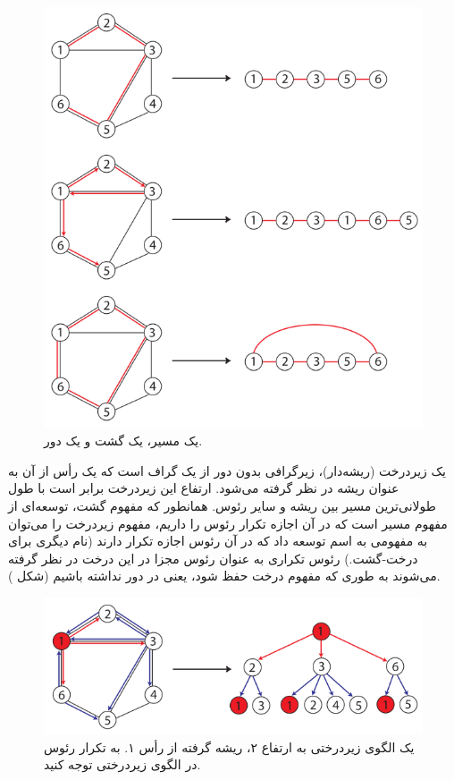 \begin{figure}[ht]
\centering
\includegraphics[scale=0.44]{./walk-path-cycle.png}
\caption{یک مسیر، یک گشت و یک دور.}
\label{fig:walk-path-cycle}
\end{figure}

یک زیردرخت (ریشه‌دار)، زیرگرافی بدون دور از یک گراف است که یک رأس از آن به عنوان ریشه در نظر گرفته می‌شود. ارتفاع این زیردرخت برابر است با طول طولانی‌ترین مسیر بین ریشه و سایر رئوس. همانطور که مفهوم گشت، توسعه‌ای از مفهوم مسیر است که در آن اجازه تکرار رئوس را داریم، مفهوم زیردرخت را می‌توان به مفهومی به اسم  توسعه داد که در آن رئوس اجازه تکرار دارند (نام دیگری برای درخت-گشت‌.) رئوس تکراری به عنوان رئوس مجزا در این درخت در نظر گرفته می‌شوند به طوری که مفهوم درخت حفظ شود، یعنی در دور نداشته باشیم (شکل ).

\begin{figure}[ht]
\centering
\includegraphics[scale=0.45]{./subtree-pattern.png}
\caption{یک الگوی زیردرختی به ارتفاع ۲، ریشه گرفته از رأس ۱. به تکرار رئوس در الگوی زیردرختی توجه کنید.}
\label{fig:subtree-pattern}
\end{figure}

